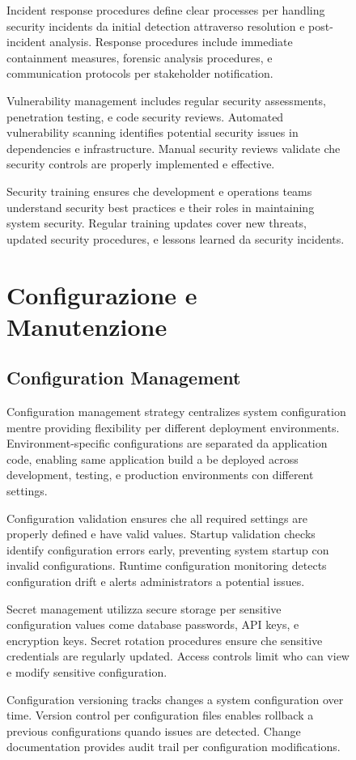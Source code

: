 \documentclass[12pt,a4paper]{article}
\begin{document}
\begin{figure}[H]
Incident response procedures define clear processes per handling security incidents da initial detection attraverso resolution e post-incident analysis. Response procedures include immediate containment measures, forensic analysis procedures, e communication protocols per stakeholder notification.

Vulnerability management includes regular security assessments, penetration testing, e code security reviews. Automated vulnerability scanning identifies potential security issues in dependencies e infrastructure. Manual security reviews validate che security controls are properly implemented e effective.

Security training ensures che development e operations teams understand security best practices e their roles in maintaining system security. Regular training updates cover new threats, updated security procedures, e lessons learned da security incidents.

\section{Configurazione e Manutenzione}

\subsection{Configuration Management}

Configuration management strategy centralizes system configuration mentre providing flexibility per different deployment environments. Environment-specific configurations are separated da application code, enabling same application build a be deployed across development, testing, e production environments con different settings.

Configuration validation ensures che all required settings are properly defined e have valid values. Startup validation checks identify configuration errors early, preventing system startup con invalid configurations. Runtime configuration monitoring detects configuration drift e alerts administrators a potential issues.

Secret management utilizza secure storage per sensitive configuration values come database passwords, API keys, e encryption keys. Secret rotation procedures ensure che sensitive credentials are regularly updated. Access controls limit who can view e modify sensitive configuration.

Configuration versioning tracks changes a system configuration over time. Version control per configuration files enables rollback a previous configurations quando issues are detected. Change documentation provides audit trail per configuration modifications.


\end{figure}
\end{document}
